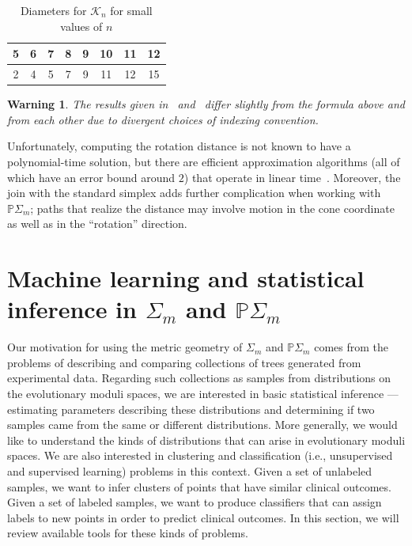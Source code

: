 \documentclass[a4paper,11pt]{article}
\newtheorem{warning}[theorem]{Warning}
\newcommand{\aK}{\mathcal{K}}
\begin{document}
\begin{table}[ht]
    \caption{Diameters for $\aK_n$ for small values of $n$}
    \centering
    \begin{tabular}{c c c c c c c c}
    \hline\hline
    5 & 6 & 7 & 8 & 9 & 10 & 11 & 12 \\
    \hline
    2 & 4 & 5 & 7 & 9 & 11 & 12 & 15 \\
    \hline
    \end{tabular}
\end{table}

\begin{warning}
The results given in~\cite{pournin2014diameter} and~\cite{sleator1988rotation} differ slightly from the formula above and from each other due to divergent choices of indexing convention.
\end{warning}

Unfortunately, computing the rotation distance is not known to have a polynomial-time solution, but there are efficient approximation algorithms (all of which have an error bound around $2$) that operate in linear time~\cite{cleary2010linear}.
Moreover, the join with the standard simplex adds further complication when working with $\mathbb{P}\Sigma_m$; paths that realize the distance may involve motion in the cone coordinate as well as in the ``rotation'' direction.


\section{Machine learning and statistical inference in $\Sigma_m$ and $\mathbb{P}\Sigma_m$}\label{sec:ML}

Our motivation for using the metric geometry of $\Sigma_m$ and $\mathbb{P}\Sigma_m$ comes from the problems of describing and comparing collections of trees generated from experimental data.
Regarding such collections as samples from distributions on the evolutionary moduli spaces, we are interested in basic statistical inference --- estimating parameters describing these distributions and determining if two samples came from the same or different distributions.
More generally, we would like to understand the kinds of distributions that can arise in evolutionary moduli spaces.
We are also interested in clustering and classification (i.e., unsupervised and supervised learning) problems in this context.
Given a set of unlabeled samples, we want to infer clusters of points that have similar clinical outcomes.
Given a set of labeled samples, we want to produce classifiers that can assign labels to new points in order to predict clinical outcomes.
In this section, we will review available tools for these kinds of problems.
\end{document}
